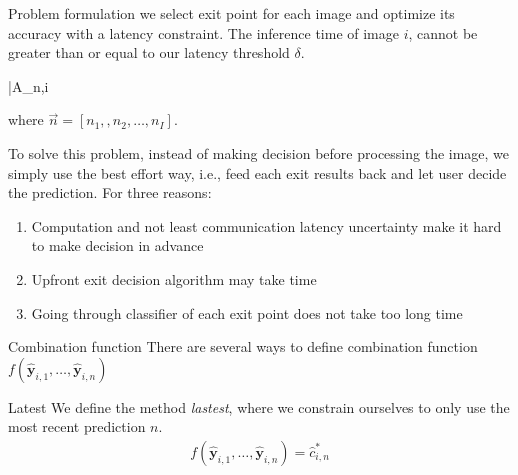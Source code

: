 \begin{enumdescript}
		\item[Problem formulation] we select exit point for each image and optimize its accuracy with a latency constraint. The inference time of image $ i $, cannot be greater than or equal to our latency threshold $ \delta $. 
		
		\begin{maxi}
			{}{\bar{A}_{n,i}}
			{}{}
		\end{maxi}
		where $\vec{n} = \left[n_1,,n_2, \dots, n_I\right]$. 
		
		To solve this problem, instead of making decision before processing the image, we simply use the best effort way, i.e., feed each exit results back and let user decide the prediction. For three reasons:
		\begin{enumerate}
			\item Computation and not least communication latency uncertainty make it hard to make decision in advance
			\item Upfront exit decision algorithm may take time
			\item Going through classifier of each exit point does not take too long time
		\end{enumerate}
		
			\item[Combination function] There are several ways to define combination function $ f\left(\mathbf{\hat{y}}_{i,1}, \dots, \mathbf{\hat{y}}_{i,n}\right) $
		\begin{enumdescript}
		
			
				\item[Latest] We define the method \emph{lastest}, where we constrain ourselves to only use the most recent prediction $n$.
				\begin{align}
					f\left(\bm{\hat{y}}_{i,1}, \dots, \bm{\hat{y}}_{i,n} \right) = \hat{c}_{i,n}^{*}
				\end{align}
				

\end{enumdescript}
\end{enumdescript}
